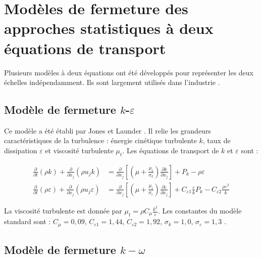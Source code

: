 \section{Modèles de fermeture des approches statistiques à deux équations de transport}
\label{sec:modeles_deux_equations}

Plusieurs modèles à deux équations ont été développés pour représenter les deux échelles indépendamment. Ils sont largement utilisés dans l'industrie \cite{hanjalic2011modelling}.

\subsection{Modèle de fermeture \texorpdfstring{$k$-$\varepsilon$}{k-epsilon}}
\label{subsec:modele_k_epsilon}

Ce modèle a été établi par Jones et Launder \cite{jones1972prediction}. Il relie les grandeurs caractéristiques de la turbulence : énergie cinétique turbulente $k$, taux de dissipation $\varepsilon$ et viscosité turbulente \( \mu_t \). Les équations de transport de $k$ et $\varepsilon$ sont \cite{launder1974application} :

\begin{align}
\frac{\partial}{\partial t} (\rho k) + \frac{\partial}{\partial x_j} (\rho u_j k) &= \frac{\partial}{\partial x_j} \left[ \left( \mu + \frac{\mu_t}{\sigma_k} \right) \frac{\partial k}{\partial x_j} \right] + P_k - \rho \varepsilon \label{eq:transport_k} \\
\frac{\partial}{\partial t} (\rho \varepsilon) + \frac{\partial}{\partial x_j} (\rho u_j \varepsilon) &= \frac{\partial}{\partial x_j} \left[ \left( \mu + \frac{\mu_t}{\sigma_\varepsilon} \right) \frac{\partial \varepsilon}{\partial x_j} \right] + C_{\varepsilon 1} \frac{\varepsilon}{k} P_k - C_{\varepsilon 2} \frac{\rho \varepsilon^2}{k} \label{eq:transport_epsilon}
\end{align}

La viscosité turbulente est donnée par \( \mu_t = \rho C_\mu \frac{k^2}{\varepsilon} \). Les constantes du modèle standard sont : \( C_\mu = 0,09 \), \( C_{\varepsilon 1} = 1,44 \), \( C_{\varepsilon 2} = 1,92 \), \( \sigma_k = 1,0 \), \( \sigma_\varepsilon = 1,3 \) \cite{launder1974numerical}.

\subsection{Modèle de fermeture \( k-\omega \)}
\label{subsec:modele_k_omega}

